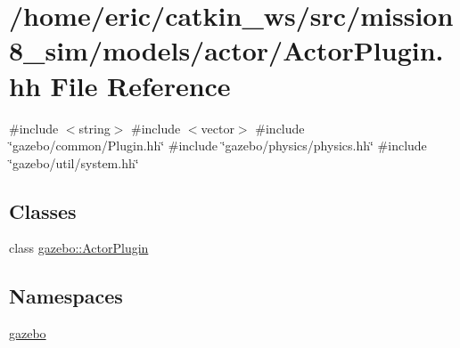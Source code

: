 \hypertarget{models_2actor_2ActorPlugin_8hh}{}\section{/home/eric/catkin\+\_\+ws/src/mission8\+\_\+sim/models/actor/\+Actor\+Plugin.hh File Reference}
\label{models_2actor_2ActorPlugin_8hh}
{\ttfamily \#include $<$string$>$}\newline
{\ttfamily \#include $<$vector$>$}\newline
{\ttfamily \#include \char`\"{}gazebo/common/\+Plugin.\+hh\char`\"{}}\newline
{\ttfamily \#include \char`\"{}gazebo/physics/physics.\+hh\char`\"{}}\newline
{\ttfamily \#include \char`\"{}gazebo/util/system.\+hh\char`\"{}}\newline
\subsection*{Classes}
\begin{DoxyCompactItemize}
\item 
class \mbox{\hyperlink{classgazebo_1_1ActorPlugin}{gazebo\+::\+Actor\+Plugin}}
\end{DoxyCompactItemize}
\subsection*{Namespaces}
\begin{DoxyCompactItemize}
\item 
 \mbox{\hyperlink{namespacegazebo}{gazebo}}
\end{DoxyCompactItemize}
